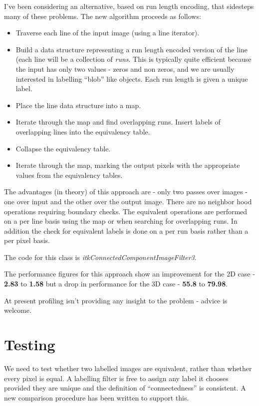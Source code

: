 \documentclass[IJ]{cesj}
\begin{document}
I've been considering an alternative, based on run length encoding,
that sidesteps many of these problems. The new algorithm proceeds as follows:
\begin{itemize}
\item Traverse each line of the input image (using a line iterator).
\item Build a data structure representing a run length encoded version
 of the line (each line will be a collection of {\em runs}. This is
 typically quite efficient because the input has only two values -
 zeros and non zeros, and we are usually interested in labelling
 ``blob'' like objects. Each run length is given a unique label.
\item Place the line data structure into a map.
\item Iterate through the map and find overlapping runs. Insert labels 
of overlapping lines into the equivalency table.
\item Collapse the equivalency table.
\item Iterate through the map, marking the output pixels with the appropriate values from the equivalency tables.
\end{itemize}

The advantages (in theory) of this approach are - only two passes over
images - one over input and the other over the output image. There are
no neighbor hood operations requiring boundary checks. The equivalent
operations are performed on a per line basis using the map or when
searching for overlapping runs. In addition the check for equivalent
labels is done on a per run basis rather than a per pixel basis.

The code for this class is {\em itkConnectedComponentImageFilter3}.

The performance figures for this approach show an improvement for the
2D case - {\bf 2.83} to {\bf 1.58} but a drop in performance for the
3D case - {\bf 55.8} to {\bf 79.98}. 

At present profiling isn't providing any insight to the problem -
advice is welcome.

\section{Testing}
We need to test whether two labelled images are equivalent, rather
than whether every pixel is equal. A labelling filter is free to
assign any label it chooses provided they are unique and the
definition of ``connectedness'' is consistent. A new comparison
procedure has been written to support this.
\end{document}
